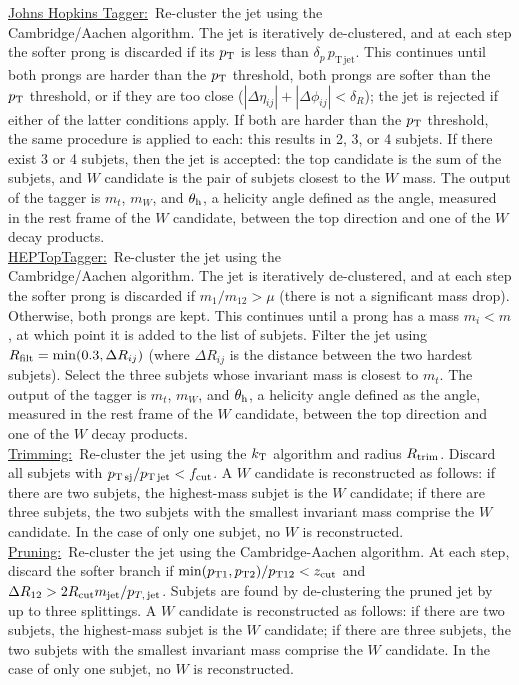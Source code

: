 \noindent \underline{Johns Hopkins Tagger:}~Re-cluster the jet using the \\Cambridge/Aachen algorithm. The jet is iteratively de-clustered, and at each step the softer prong is discarded if its $p_{\rm T}$ is less than $\delta_p\,p_{\mathrm{T\,jet}}$. This continues until both prongs are harder than the $p_{\rm T}$ threshold, both prongs are softer than the $p_{\rm T}$ threshold, or if they are too close ($|\Delta\eta_{ij}|+|\Delta\phi_{ij}|<\delta_R$); the jet is rejected if either of the latter conditions apply. If both are harder than the $p_{\rm T}$ threshold, the same procedure is applied to each: this results in 2, 3, or 4 subjets. If there exist 3 or 4 subjets, then the jet is accepted: the top candidate is the sum of the subjets, and $W$ candidate is the pair of subjets closest to the $W$ mass. The output of the tagger is $m_t$, $m_W$, and $\theta_{\rm h}$, a helicity angle defined as the angle, measured in the rest frame of the $W$ candidate, between the top direction and one of the $W$ decay products.\\

\noindent \underline{HEPTopTagger:}~Re-cluster the jet using the \\Cambridge/Aachen algorithm. The jet is iteratively de-clustered, and at each step the softer prong is discarded if $m_1/m_{12}>\mu$ (there is not a significant mass drop). Otherwise, both prongs are kept. This continues until a prong has a mass $m_i < m$, at which point it is added to the list of subjets. Filter the jet using $R_{\rm filt}=\mathrm{min}(0.3,\Delta R_{ij})$ (where $\Delta R_{ij}$ is the distance between the two hardest subjets). Select the three subjets whose invariant mass is closest to $m_t$. The output of the tagger is $m_t$, $m_W$, and $\theta_{\rm h}$, a helicity angle defined as the angle, measured in the rest frame of the $W$ candidate, between the top direction and one of the $W$ decay products.\\

\noindent \underline{Trimming:}~Re-cluster the jet using the $k_{\rm T}$ algorithm and radius $R_{\rm trim}$. Discard all subjets with $p_{\rm T\,sj}/p_{\rm T\,jet} < f_{\rm cut}$. A $W$ candidate is reconstructed as follows: if there are two subjets, the highest-mass subjet is the $W$ candidate; if there are three subjets, the two subjets with the smallest invariant mass comprise the $W$ candidate. In the case of only one subjet, no $W$ is reconstructed.\\

\noindent \underline{Pruning:}~Re-cluster the jet using the Cambridge-Aachen algorithm. At each step, discard the softer branch if $\mathrm{min}(p_{\rm T1},p_{\rm T2}) / p_{\rm T12} < z_{\rm cut}$ and $\Delta R_{12}>2R_{\rm cut}m_{\rm jet}/p_{T,\,\mathrm{jet}}$. Subjets are found by de-clustering the pruned jet by up to three splittings. A $W$ candidate is reconstructed as follows: if there are two subjets, the highest-mass subjet is the $W$ candidate; if there are three subjets, the two subjets with the smallest invariant mass comprise the $W$ candidate. In the case of only one subjet, no $W$ is reconstructed.
